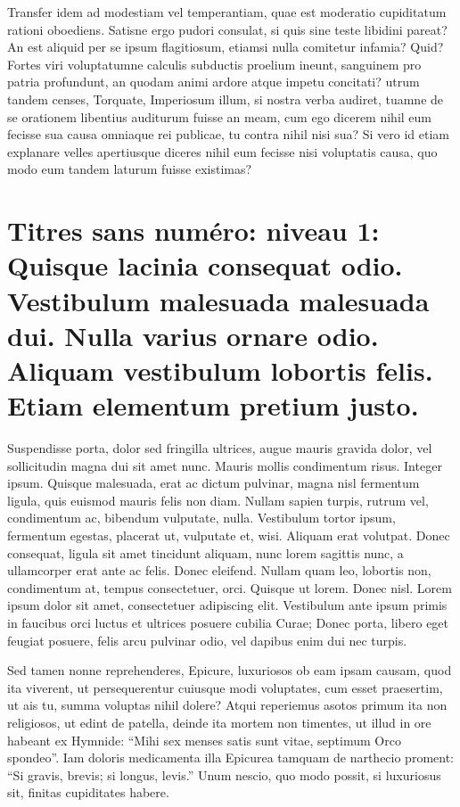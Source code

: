 \documentclass[twoside]{extreport}
\begin{document}
Transfer idem ad modestiam vel temperantiam, quae est moderatio
cupiditatum rationi oboediens. Satisne ergo pudori consulat, si quis
sine teste libidini pareat? An est aliquid per se ipsum flagitiosum,
etiamsi nulla comitetur infamia? Quid? Fortes viri voluptatumne calculis
subductis proelium ineunt, sanguinem pro patria profundunt, an quodam
animi ardore atque impetu concitati? utrum tandem censes, Torquate,
Imperiosum illum, si nostra verba audiret, tuamne de se orationem
libentius auditurum fuisse an meam, cum ego dicerem nihil eum fecisse
sua causa omniaque rei publicae, tu contra nihil nisi sua? Si vero id
etiam explanare velles apertiusque diceres nihil eum fecisse nisi
voluptatis causa, quo modo eum tandem laturum fuisse existimas?

\hypertarget{h:koppen-zonder-nummer}{%
\chapter*{Titres sans numéro: niveau 1: Quisque lacinia consequat odio.
Vestibulum malesuada malesuada dui. Nulla varius ornare odio. Aliquam
vestibulum lobortis felis. Etiam elementum pretium
justo.}\label{h:koppen-zonder-nummer}}

Suspendisse porta, dolor sed fringilla ultrices, augue mauris gravida
dolor, vel sollicitudin magna dui sit amet nunc. Mauris mollis
condimentum risus. Integer ipsum. Quisque malesuada, erat ac dictum
pulvinar, magna nisl fermentum ligula, quis euismod mauris felis non
diam. Nullam sapien turpis, rutrum vel, condimentum ac, bibendum
vulputate, nulla. Vestibulum tortor ipsum, fermentum egestas, placerat
ut, vulputate et, wisi. Aliquam erat volutpat. Donec consequat, ligula
sit amet tincidunt aliquam, nunc lorem sagittis nunc, a ullamcorper erat
ante ac felis. Donec eleifend. Nullam quam leo, lobortis non,
condimentum at, tempus consectetuer, orci. Quisque ut lorem. Donec nisl.
Lorem ipsum dolor sit amet, consectetuer adipiscing elit. Vestibulum
ante ipsum primis in faucibus orci luctus et ultrices posuere cubilia
Curae; Donec porta, libero eget feugiat posuere, felis arcu pulvinar
odio, vel dapibus enim dui nec turpis.

Sed tamen nonne reprehenderes, Epicure, luxuriosos ob eam ipsam causam,
quod ita viverent, ut persequerentur cuiusque modi voluptates, cum esset
praesertim, ut ais tu, summa voluptas nihil dolere? Atqui reperiemus
asotos primum ita non religiosos, ut edint de patella, deinde ita mortem
non timentes, ut illud in ore habeant ex Hymnide: ``Mihi sex menses
satis sunt vitae, septimum Orco spondeo''. Iam doloris medicamenta illa
Epicurea tamquam de narthecio proment: ``Si gravis, brevis; si longus,
levis.'' Unum nescio, quo modo possit, si luxuriosus sit, finitas
cupiditates habere.
\end{document}
